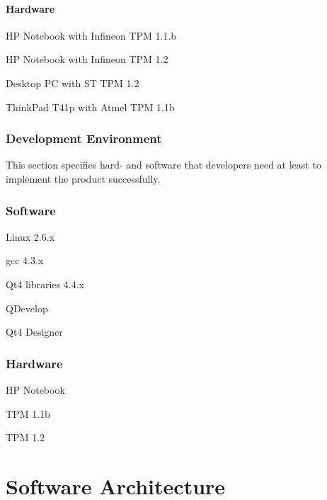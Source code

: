 \documentclass[
  american        %
]{sirrixreport}
\begin{document}
\subsubsection{Hardware}
\begin{compactitem}
 \item HP Notebook with Infineon TPM 1.1.b
 \item HP Notebook with Infineon TPM 1.2
 \item Desktop PC with ST TPM 1.2
 \item ThinkPad T41p with Atmel TPM 1.1b
\end{compactitem}

\subsection{Development Environment}

   This section specifies hard- and software that developers need at
   least to implement the product successfully.

\subsection{Software}
\begin{compactitem}
 \item Linux 2.6.x
 \item gcc 4.3.x
 \item Qt4 libraries 4.4.x
 \item QDevelop
 \item Qt4 Designer
\end{compactitem}

\subsection{Hardware}
\begin{compactitem}
 \item HP Notebook
 \item TPM 1.1b
 \item TPM 1.2
\end{compactitem}

\chapter{Software Architecture}
\label{chap:architecture}
\end{document}
